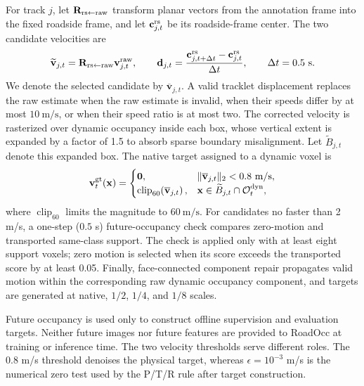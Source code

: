 For track $j$, let $\mathbf R_{\rm rs\leftarrow raw}$ transform planar vectors
from the annotation frame into the fixed roadside frame, and let
$\mathbf c_{j,t}^{\rm rs}$ be its roadside-frame center. The two candidate
velocities are
\begin{equation}
 \widetilde{\mathbf v}_{j,t}
 =\mathbf R_{\rm rs\leftarrow raw}\mathbf v^{\rm raw}_{j,t},
 \qquad
 \mathbf d_{j,t}
 =\frac{\mathbf c_{j,t+\Delta t}^{\rm rs}-\mathbf c_{j,t}^{\rm rs}}{\Delta t},
 \qquad \Delta t=0.5\ \mathrm{s}.
 \label{eq:supp_velocity_candidates}
\end{equation}
We denote the selected candidate by $\overline{\mathbf v}_{j,t}$. A valid
tracklet displacement replaces the raw estimate when the raw estimate is
invalid, when their speeds differ by at most $10\ \mathrm{m/s}$, or when their
speed ratio is at most two.
The corrected velocity is rasterized over dynamic occupancy inside each box,
whose vertical extent is expanded by a factor of 1.5 to absorb sparse boundary
misalignment. Let $\widetilde B_{j,t}$ denote this expanded box. The native
target assigned to a dynamic voxel is
\begin{equation}
 \mathbf v_t^{\rm gt}(\mathbf x)=
 \begin{cases}
 \mathbf 0, & \|\overline{\mathbf v}_{j,t}\|_2<0.8\ \mathrm{m/s},\\
 \operatorname{clip}_{60}\!\left(\overline{\mathbf v}_{j,t}\right),
 & \mathbf x\in\widetilde B_{j,t}\cap\mathcal O_{t}^{\rm dyn},
 \end{cases}
 \label{eq:supp_velocity_rasterization}
\end{equation}
where $\operatorname{clip}_{60}$ limits the magnitude to $60\ \mathrm{m/s}$.
For candidates no faster than 2 m/s, a one-step ($0.5$ s)
future-occupancy check compares zero-motion and transported same-class support.
The check is applied only with at least eight support voxels; zero motion is
selected when its score exceeds the transported score by at least 0.05.
Finally, face-connected component repair propagates valid motion within the
corresponding raw dynamic occupancy component, and targets are generated at
native, $1/2$, $1/4$, and $1/8$ scales.

Future occupancy is used only to construct offline supervision and evaluation
targets. Neither future images nor future features are provided to RoadOcc at
training or inference time. The two velocity thresholds serve different roles.
The 0.8 m/s threshold denoises the physical target, whereas
$\epsilon=10^{-3}$ m/s is the numerical zero test used by the P/T/R rule after
target construction.

